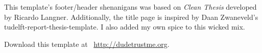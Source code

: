 \newpage
\pagestyle{empty}
\hfill
\vfill
{}
\section*{} %

This template's footer/header shenanigans was based on \textit{Clean Thesis} developed by Ricardo Langner. Additionally, the title page is inspired by Daan Zwaneveld's tudelft-report-thesis-template. I also added my own spice to this wicked mix.

Download this template at \, \url{http://dudetrustme.org}.